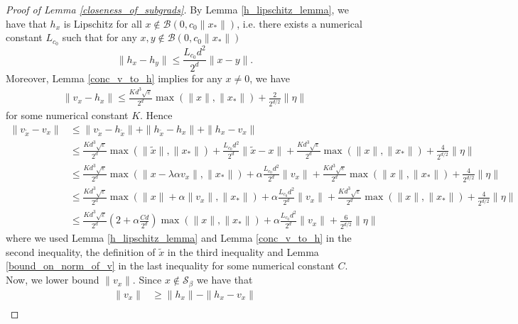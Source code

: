 \documentclass[11pt]{article}
\renewcommand{\epsilon}{\varepsilon}
\newcommand{\al}{\alpha}
\newcommand{\Seps}{\mathcal{S}}
\theoremstyle{remark}
\begin{document}
\begin{proof}[Proof of Lemma \ref{closeness_of_subgrads}]

 By Lemma \ref{h_lipschitz_lemma}, we have that $h_x$ is Lipschitz for all $x \notin \mathcal{B}(0,c_0\|x_*\|)$, i.e. there exists a numerical constant $L_{c_0}$ such that for any $x,y \notin \mathcal{B}(0,c_0\|x_*\|)$ $$\|h_x - h_y\| \leqslant \frac{L_{c_0} d^2}{2^d}\|x-y\|.$$ Moreover, Lemma \ref{conc_v_to_h} implies for any $x \neq 0$, we have \begin{align*}
    \|v_x - h_x\| \leqslant  \frac{Kd^3\sqrt{\epsilon}}{2^d}\max(\|x\|,\|x_*\|) + \frac{2}{2^{d/2}}\|\eta\|
\end{align*} for some numerical constant $K$. Hence  \begin{align}
    \|v_{\tilde{x}} - v_{x}\| & \leqslant \|v_{\tilde{x}} - h_{\tilde{x}}\| + \|h_{\tilde{x}} - h_{x}\| + \|h_{x} - v_{x}\| \nonumber\\
    & \leqslant \frac{Kd^3\sqrt{\epsilon}}{2^d}\max(\|\tilde{x}\|,\|x_*\|) + \frac{L_{c_0} d^2}{2^d}\|\tilde{x} - x\| + \frac{Kd^3\sqrt{\epsilon}}{2^d}\max(\|x\|,\|x_*\|) + \frac{4}{2^{d/2}}\|\eta\|\nonumber\\
    & \leqslant \frac{Kd^3\sqrt{\epsilon}}{2^d}\max(\|x - \lambda\al v_{x}\|,\|x_*\|) + \al\frac{L_{c_0} d^2}{2^d}\|v_{x}\| + \frac{Kd^3\sqrt{\epsilon}}{2^d}\max(\|x\|,\|x_*\|) + \frac{4}{2^{d/2}}\|\eta\| \nonumber\\
    & \leqslant \frac{Kd^3\sqrt{\epsilon}}{2^d}\max(\|x\| + \al \| v_{x}\|,\|x_*\|) + \al\frac{L_{c_0} d^2}{2^d}\|v_{x}\| + \frac{Kd^3\sqrt{\epsilon}}{2^d}\max(\|x\|,\|x_*\|) + \frac{4}{2^{d/2}}\|\eta\|\nonumber \\
    & \leqslant \frac{Kd^3\sqrt{\epsilon}}{2^d}\left(2 + \al\frac{Cd}{2^d}\right)\max(\|x\|,\|x_*\|) + \al \frac{L_{c_0} d^2}{2^d}\|v_{x}\| + \frac{6}{2^{d/2}}\|\eta\| \label{first_bound_onsubgrad_diff} %
\end{align} where we used Lemma \ref{h_lipschitz_lemma} and Lemma \ref{conc_v_to_h} in the second inequality, the definition of $\tilde{x}$ in the third inequality and Lemma \ref{bound_on_norm_of_v} in the last inequality for some numerical constant $C$. Now, we lower bound $\|v_{x}\|$. Since $x \notin \Seps_{\beta}$ we have that \begin{align}
    \|v_{x}\| & \geqslant \|h_{x}\| - \|h_{x} - v_{x}\| \nonumber \\

\end{align}
\end{proof}
\end{document}
